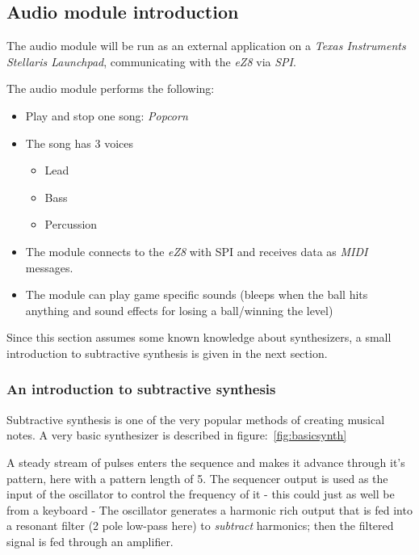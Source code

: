 \subsection{Audio module introduction}
The audio module will be run as an external application on a \emph{Texas
Instruments} \emph{Stellaris Launchpad}, communicating with the \emph{eZ8} via
\emph{SPI}.

The audio module performs the following:
\begin{itemize}
  \item Play and stop one song: \emph{Popcorn}
  \item The song has 3 voices
  \begin{itemize}
    \item Lead
    \item Bass
    \item Percussion
  \end{itemize}
  \item The module connects to the \emph{eZ8} with SPI and receives data as
  \emph{MIDI} messages.
  \item The module can play game specific sounds (bleeps when the ball hits
  anything and sound effects for losing a ball/winning the level)
\end{itemize}

Since this section assumes some known knowledge about synthesizers, a small
introduction to subtractive synthesis is given in the next section.

\subsubsection{An introduction to subtractive synthesis}\label{synthxp}
Subtractive synthesis is one of the very popular methods of creating musical
notes. A very basic synthesizer is described in figure:~\ref{fig:basicsynth}


A steady stream of pulses enters the sequence and makes it advance through it's
pattern, here with a pattern length of 5. The sequencer output is used as the
input of the oscillator to control the frequency of it - this could just as well
be from a keyboard - The oscillator generates a harmonic rich output that is fed
into a resonant filter (2 pole low-pass here) to \emph{subtract} harmonics; then
the filtered signal is fed through an amplifier.

